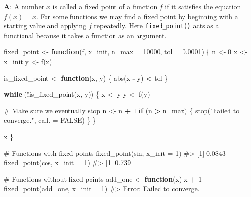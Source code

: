 \documentclass[
]{krantz}
\makeatletter
\newenvironment{Shaded}{\begin{snugshade}}{\end{snugshade}}
\newcommand{\CommentTok}[1]{\textcolor[rgb]{0.56,0.35,0.01}{\textit{#1}}}
\newcommand{\ControlFlowTok}[1]{\textcolor[rgb]{0.13,0.29,0.53}{\textbf{#1}}}
\newcommand{\DataTypeTok}[1]{\textcolor[rgb]{0.13,0.29,0.53}{#1}}
\newcommand{\DecValTok}[1]{\textcolor[rgb]{0.00,0.00,0.81}{#1}}
\newcommand{\FloatTok}[1]{\textcolor[rgb]{0.00,0.00,0.81}{#1}}
\newcommand{\KeywordTok}[1]{\textcolor[rgb]{0.13,0.29,0.53}{\textbf{#1}}}
\newcommand{\NormalTok}[1]{#1}
\newcommand{\OperatorTok}[1]{\textcolor[rgb]{0.81,0.36,0.00}{\textbf{#1}}}
\newcommand{\OtherTok}[1]{\textcolor[rgb]{0.56,0.35,0.01}{#1}}
\newcommand{\StringTok}[1]{\textcolor[rgb]{0.31,0.60,0.02}{#1}}
\newenvironment{kframe}{%
\medskip{}
\setlength{\fboxsep}{.8em}
 \def\at@end@of@kframe{}%
 \ifinner\ifhmode%
  \def\at@end@of@kframe{\end{minipage}}%
  \begin{minipage}{\columnwidth}%
 \fi\fi%
 \def\FrameCommand##1{\hskip\@totalleftmargin \hskip-\fboxsep
 \colorbox{shadecolor}{##1}\hskip-\fboxsep
     \hskip-\linewidth \hskip-\@totalleftmargin \hskip\columnwidth}%
 \MakeFramed {\advance\hsize-\width
   \@totalleftmargin\z@ \linewidth\hsize
   \@setminipage}}%
 {\par\unskip\endMakeFramed%
 \at@end@of@kframe}
\renewenvironment{Shaded}{\begin{kframe}}{\end{kframe}}
\renewcommand{\KeywordTok} [1]{\textcolor[rgb]{0.00,0.44,0.13}{{#1}}}
\renewcommand{\DataTypeTok}[1]{\textcolor[rgb]{0.56,0.13,0.00}{{#1}}}
\renewcommand{\DecValTok}  [1]{\textcolor[rgb]{0.25,0.63,0.44}{{#1}}}
\renewcommand{\FloatTok}   [1]{\textcolor[rgb]{0.25,0.63,0.44}{{#1}}}
\renewcommand{\StringTok}  [1]{\textcolor[rgb]{0.25,0.44,0.63}{{#1}}}
\renewcommand{\CommentTok} [1]{\textcolor[rgb]{0.38,0.63,0.69}{{#1}}}
\renewcommand{\OtherTok}   [1]{\textcolor[rgb]{0.00,0.44,0.13}{{#1}}}
\renewcommand{\NormalTok}  [1]{{#1}}
\makeatother
\begin{document}
\textbf{{A}}: A number \(x\) is called a fixed point of a function \(f\) if it satisfies the equation \(f(x) = x\). For some functions we may find a fixed point by beginning with a starting value and applying \(f\) repeatedly. Here \texttt{fixed\_point()} acts as a functional because it takes a function as an argument.

\begin{Shaded}
\begin{Highlighting}[]
\NormalTok{fixed_point <-}\StringTok{ }\ControlFlowTok{function}\NormalTok{(f, x_init, }\DataTypeTok{n_max =} \DecValTok{10000}\NormalTok{, }\DataTypeTok{tol =} \FloatTok{0.0001}\NormalTok{) \{}
\NormalTok{  n <-}\StringTok{ }\DecValTok{0}
\NormalTok{  x <-}\StringTok{ }\NormalTok{x_init}
\NormalTok{  y <-}\StringTok{ }\KeywordTok{f}\NormalTok{(x)}
  
\NormalTok{  is_fixed_point <-}\StringTok{ }\ControlFlowTok{function}\NormalTok{(x, y) \{}
    \KeywordTok{abs}\NormalTok{(x }\OperatorTok{-}\StringTok{ }\NormalTok{y) }\OperatorTok{<}\StringTok{ }\NormalTok{tol}
\NormalTok{  \}}
  
  \ControlFlowTok{while}\NormalTok{ (}\OperatorTok{!}\KeywordTok{is_fixed_point}\NormalTok{(x, y)) \{}
\NormalTok{    x <-}\StringTok{ }\NormalTok{y}
\NormalTok{    y <-}\StringTok{ }\KeywordTok{f}\NormalTok{(y)}
    
    \CommentTok{# Make sure we eventually stop}
\NormalTok{    n <-}\StringTok{ }\NormalTok{n }\OperatorTok{+}\StringTok{ }\DecValTok{1}
    \ControlFlowTok{if}\NormalTok{ (n }\OperatorTok{>}\StringTok{ }\NormalTok{n_max) \{}
      \KeywordTok{stop}\NormalTok{(}\StringTok{"Failed to converge."}\NormalTok{, }\DataTypeTok{call. =} \OtherTok{FALSE}\NormalTok{)}
\NormalTok{    \}}
\NormalTok{  \}}
  
\NormalTok{  x}
\NormalTok{\}}


\CommentTok{# Functions with fixed points}
\KeywordTok{fixed_point}\NormalTok{(sin, }\DataTypeTok{x_init =} \DecValTok{1}\NormalTok{)}
\CommentTok{#> [1] 0.0843}
\KeywordTok{fixed_point}\NormalTok{(cos, }\DataTypeTok{x_init =} \DecValTok{1}\NormalTok{)}
\CommentTok{#> [1] 0.739}

\CommentTok{# Functions without fixed points}
\NormalTok{add_one <-}\StringTok{ }\ControlFlowTok{function}\NormalTok{(x) x }\OperatorTok{+}\StringTok{ }\DecValTok{1}
\KeywordTok{fixed_point}\NormalTok{(add_one, }\DataTypeTok{x_init =} \DecValTok{1}\NormalTok{)}
\CommentTok{#> Error: Failed to converge.}
\end{Highlighting}
\end{Shaded}
\end{document}
